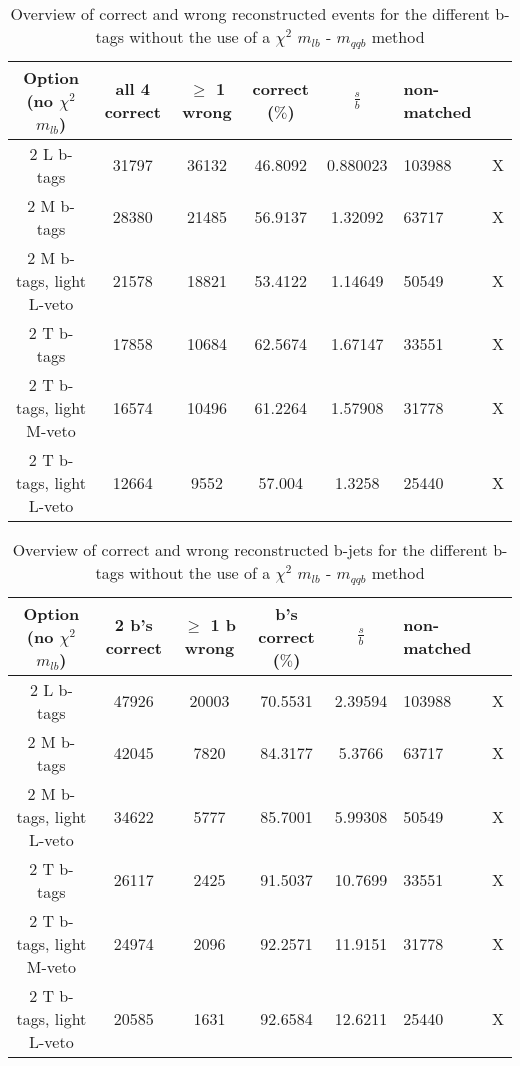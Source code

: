  \begin{table}[!h] 
 \begin{tabular}{c|c|c|c|c} 
\textbf{Option} (no $\chi^{2}$ $m_{lb}$) & all 4 correct & $\geq$ 1 wrong & correct ($\%$)       & $\frac{s}{b}$ & non-matched \\  L b-tags              & 31797 & 36132 & 46.8092 & 0.880023 & 103988 & X \\ 
2 M b-tags              & 28380 & 21485 & 56.9137 & 1.32092 & 63717 & X \\ 
2 M b-tags, light L-veto & 21578 & 18821 & 53.4122 & 1.14649 & 50549 & X \\ 
2 T b-tags              & 17858 & 10684 & 62.5674 & 1.67147 & 33551 & X \\ 
2 T b-tags, light M-veto & 16574 & 10496 & 61.2264 & 1.57908 & 31778 & X \\ 
2 T b-tags, light L-veto & 12664 & 9552 & 57.004 & 1.3258 & 25440 & X \\ 
 \end{tabular} 
\caption{Overview of correct and wrong reconstructed events for the different b-tags without the use of a $\chi^{2}$ $m_{lb}$ - $m_{qqb}$ method} 
 \end{table} 
 
 \begin{table}[!h] 
 \begin{tabular}{c|c|c|c|c} 
\textbf{Option} (no $\chi^{2}$ $m_{lb}$) & 2 b's correct & $\geq$ 1 b wrong & b's correct ($\%$) & $\frac{s}{b}$ & non-matched \\  L b-tags              & 47926 & 20003 & 70.5531 & 2.39594 & 103988 & X \\ 
2 M b-tags              & 42045 & 7820 & 84.3177 & 5.3766 & 63717 & X \\ 
2 M b-tags, light L-veto & 34622 & 5777 & 85.7001 & 5.99308 & 50549 & X \\ 
2 T b-tags              & 26117 & 2425 & 91.5037 & 10.7699 & 33551 & X \\ 
2 T b-tags, light M-veto & 24974 & 2096 & 92.2571 & 11.9151 & 31778 & X \\ 
2 T b-tags, light L-veto & 20585 & 1631 & 92.6584 & 12.6211 & 25440 & X \\ 
 \end{tabular} 
\caption{Overview of correct and wrong reconstructed b-jets for the different b-tags without the use of a $\chi^{2}$ $m_{lb}$ - $m_{qqb}$ method} 
 \end{table} 
 
